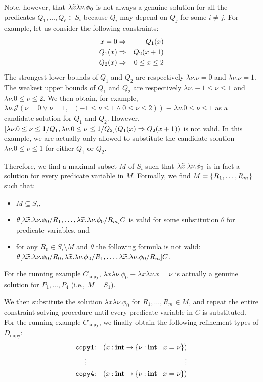 Note, however, that \(\lambda \widetilde{x} \lambda \nu.\phi_0\) is not always
a genuine solution for all the predicates \(Q_1,\dots,Q_{\ell} \in S_i\)
because \(Q_i\) may depend on \(Q_j\) for some \(i \neq j\).  For
example, let us consider the following constraints:
\begin{eqnarray*}
x=0 &\Rightarrow& Q_1(x) \\
Q_1(x) &\Rightarrow& Q_2(x+1) \\
Q_2(x) &\Rightarrow& 0 \leq x \leq 2
\end{eqnarray*}
The strongest lower bounds of \(Q_1\) and \(Q_2\) are respectively
\(\lambda \nu.\nu=0\) and \(\lambda \nu.\nu=1\).  The weakest upper
bounds of \(Q_1\) and \(Q_2\) are respectively \(\lambda \nu.-1 \leq \nu
\leq 1\) and \(\lambda \nu.0 \leq \nu \leq 2\).  We then obtain, for
example, \(\lambda \nu.\mathcal{J}(\nu=0 \lor \nu=1,\neg (-1 \leq \nu
\leq 1 \land 0 \leq \nu \leq 2)) \equiv \lambda \nu.0 \leq \nu \leq 1\)
as a candidate solution for \(Q_1\) and \(Q_2\).  However, \([\lambda
\nu.0 \leq \nu \leq 1/Q_1,\lambda \nu.0 \leq \nu \leq 1/Q_2](Q_1(x)
\Rightarrow Q_2(x+1))\) is not valid.  In this example, we are actually only
allowed to substitute the candidate solution \(\lambda \nu.0 \leq \nu
\leq 1\) for either \(Q_1\) or \(Q_2\).

Therefore, we find a maximal subset \(M\) of \(S_i\) such that
\(\lambda\widetilde{x}.\lambda \nu.\phi_0\) is in fact a solution for every
predicate variable in \(M\).  Formally, we find \(M=\{{R_1,\dots,R_m}\}\)
such that:
\begin{itemize}
\item \(M \subseteq S_i\),
\item \(\theta[\lambda\widetilde{x}.\lambda
\nu.\phi_0/R_1,\dots,\lambda\widetilde{x}.\lambda \nu.\phi_0/R_m]C\) is valid
for some substitution \(\theta\) for predicate variables, and
\item for any \(R_0 \in S_i \setminus M\) and \(\theta\) the following
formula is not valid: \(\theta[\lambda\widetilde{x}.\lambda
\nu.\phi_0/R_0,\lambda\widetilde{x}.\lambda
\nu.\phi_0/R_1,\dots,\lambda\widetilde{x}.\lambda \nu.\phi_0/R_m]C\).
\end{itemize}
For the running example \(C_{\texttt{copy}}\), \(\lambda x \lambda
\nu.\phi_0 \equiv \lambda x \lambda \nu.x=\nu\) is actually a genuine
solution for \(P_1,\dots,P_4\) (i.e., \(M=S_1\)).

We then substitute the solution \(\lambda x \lambda \nu.\phi_0\) for
\(R_1,\dots,R_m \in M\), and repeat the entire constraint solving
procedure until every predicate variable in \(C\) is substituted.  For
the running example \(C_{\texttt{copy}}\), we finally obtain the
following refinement types of \(D_{\texttt{copy}}\):
\begin{eqnarray*}
\texttt{copy1}&\mathbin{:}&(x\mathbin{:}{\mathbf{int}}\mathbin{\rightarrow}{\{{\nu\mathbin{:}\mathbf{int} \mid x=\nu}\}}) \\
\vdots\quad &&\qquad\qquad \vdots \\
\texttt{copy4}&\mathbin{:}&(x\mathbin{:}{\mathbf{int}}\mathbin{\rightarrow}{\{{\nu\mathbin{:}\mathbf{int} \mid x=\nu}\}})
\end{eqnarray*}

